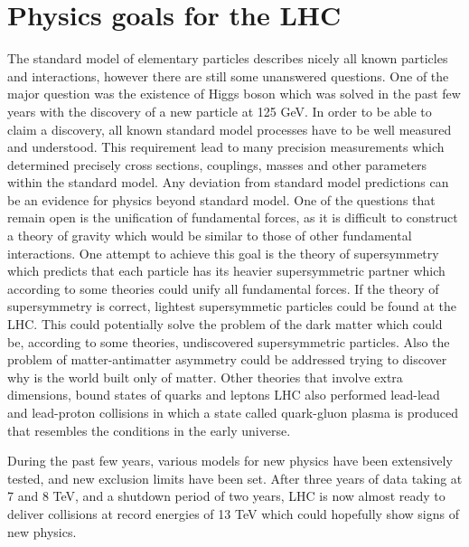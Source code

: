
\section{Physics goals for the LHC}

The standard model of elementary particles describes nicely all known particles and interactions, however there are still some unanswered questions. One of the major question was the existence of Higgs boson which was solved in the past few years with the discovery of a new particle at 125 GeV. In order to be able to claim a discovery, all known standard model processes have to be well measured and understood. This requirement lead to many precision measurements which determined precisely cross sections, couplings, masses and other parameters within the standard model. Any deviation from standard model predictions can be an evidence for physics beyond standard model. One of the questions that remain open is the unification of fundamental forces, as it is difficult to construct a theory of gravity which would be similar to those of other fundamental interactions. One attempt to achieve this goal is the theory of supersymmetry which predicts that each particle has its heavier supersymmetric partner which according to some theories could unify all fundamental forces. If the theory of supersymmetry is correct, lightest supersymmetic particles could be found at the LHC. This could potentially solve the problem of the dark matter which could be, according to some theories, undiscovered supersymmetric particles. Also the problem of matter-antimatter asymmetry could be addressed trying to discover why is the world built only of matter. Other theories that involve extra dimensions, bound states of quarks and leptons LHC also performed lead-lead and lead-proton collisions in which a state called quark-gluon plasma is produced that resembles the conditions in the early universe. 
\par During the past few years, various models for new physics have been extensively tested, and new exclusion limits have been set. After three years of data taking at 7 and 8 TeV, and a shutdown period of two years, LHC is now almost ready to deliver collisions at record energies of 13 TeV which could hopefully show signs of new physics.        


